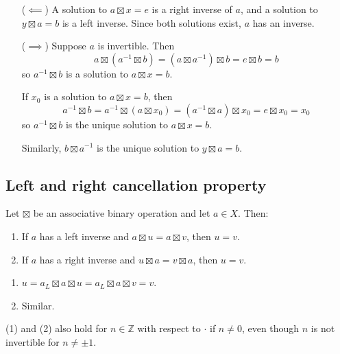 \documentclass[12pt,letterpaper]{report}
\begin{document}
\begin{thmproof}
  \begin{itemize}[leftmargin=4em]
    \item[($\impliedby$)]
    A solution to $a \boxtimes x = e$ is a right inverse of $a$, and a solution to
    $y \boxtimes a = b$ is a left inverse.
    Since both solutions exist, $a$ has an inverse.
    \item[($\implies$)]
    Suppose $a$ is invertible.
    Then
    \[ a \boxtimes (a^{-1} \boxtimes b) = (a \boxtimes a^{-1}) \boxtimes b = e \boxtimes b = b \]
    so $a^{-1} \boxtimes b$ is a solution to $a \boxtimes x = b$.

    If $x_0$ is a solution to $a \boxtimes x = b$, then
    \[
      a^{-1} \boxtimes b = a^{-1} \boxtimes (a \boxtimes x_0) = (a^{-1} \boxtimes a) \boxtimes x_0
        = e \boxtimes x_0 = x_0
    \]
    so $a^{-1} \boxtimes b$ is the unique solution to $a \boxtimes x = b$.

    Similarly, $b \boxtimes a^{-1}$ is the unique solution to $y \boxtimes a = b$.
  \end{itemize}
\end{thmproof}

\pagebreak
\subsection{Left and right cancellation property}

\begin{prop}{}{}
  Let $\boxtimes$ be an associative binary operation and let $a \in X$.
  Then:
  \begin{enumerate}
    \item If $a$ has a left inverse and $a \boxtimes u = a \boxtimes v$, then $u = v$.
    \item If $a$ has a right inverse and $u \boxtimes a = v \boxtimes a$, then $u = v$.
  \end{enumerate}
\end{prop}

\begin{thmproof}
  \begin{enumerate}
    \item $u = a_L \boxtimes a \boxtimes u = a_L \boxtimes a \boxtimes v = v$.
    \item Similar.
  \end{enumerate}
\end{thmproof}

(1) and (2) also hold for $n \in \mathbb{Z}$ with respect to $\cdot$ if $n \neq 0$, even though $n$
is not invertible for $n \neq \pm 1$.
\end{document}
